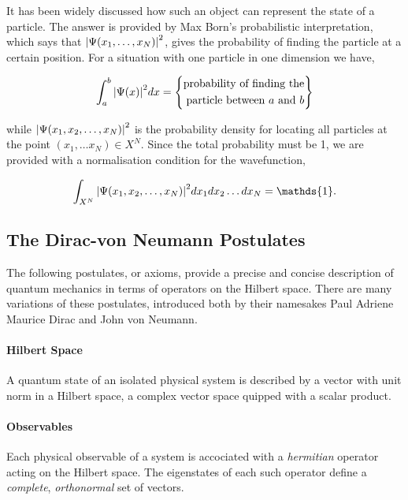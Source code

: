     It has been widely discussed how such an object can represent the state of a 
    particle. The answer is provided by Max Born's probabilistic interpretation,
    which says that $\abs{\Psi(x_1, \dots, x_N)}^2$, gives the probability of finding
    the particle at a certain position. For a situation with one particle in one
    dimension we have,

    \begin{equation}
        \int_a^b \abs{\Psi(x)}^2 dx = 
        \left\{\begin{aligned}
            \text{probability of finding the} \\
            \text{particle between $a$ and $b$}
        \end{aligned}\right\}
    \end{equation}

    while $\abs{\Psi(x_1, x_2, \dots, x_N)}^2$ is the probability density for locating
    all particles at the point $(x_1, \dots x_N) \in X^N$. Since the total probability
    must be 1, we are provided with a normalisation condition for the wavefunction,
    
    \begin{equation}
        \int_{X^N} \abs{\Psi(x_1, x_2, \dots, x_N)}^2 dx_1 dx_2\dots dx_N = \mathds{1}.
    \end{equation}
    
\subsection{The Dirac-von Neumann Postulates}

    The following postulates, or axioms, provide a precise and concise description 
    of quantum mechanics in terms of operators on the Hilbert space. There are
    many variations of these postulates, introduced both by their namesakes 
    Paul Adriene Maurice Dirac\cite{dirac1930principles} and John von 
    Neumann\cite{vonNeumann1932foundations}.

    \paragraph{Hilbert Space}
    A quantum state of an isolated physical system is described by a vector
    with unit norm in a Hilbert space, a complex vector space quipped with a
    scalar product. 

    \paragraph{Observables}
    Each physical observable of a system is accociated with a \emph{hermitian}
    operator acting on the Hilbert space. The eigenstates of each such
    operator define a \emph{complete}, \emph{orthonormal} set of vectors.


